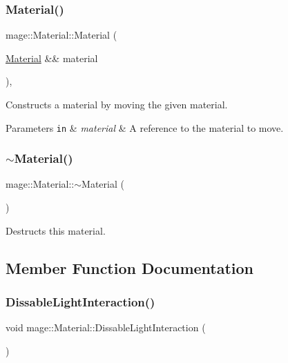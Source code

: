 \subsubsection{\texorpdfstring{Material()}{Material()}\hspace{0.1cm}{\footnotesize\ttfamily [3/3]}}
{\footnotesize\ttfamily mage\+::\+Material\+::\+Material (\begin{DoxyParamCaption}\item[{\hyperlink{classmage_1_1_material}{Material} \&\&}]{material }\end{DoxyParamCaption})\hspace{0.3cm}{\ttfamily [default]}, {\ttfamily [noexcept]}}

Constructs a material by moving the given material.


\begin{DoxyParams}[1]{Parameters}
\mbox{\tt in}  & {\em material} & A reference to the material to move. \\
\hline
\end{DoxyParams}
\hypertarget{classmage_1_1_material_a4ca65b7e24144ee08dd1ce8d0eda9284}{}\label{classmage_1_1_material_a4ca65b7e24144ee08dd1ce8d0eda9284} 
\subsubsection{\texorpdfstring{$\sim$\+Material()}{~Material()}}
{\footnotesize\ttfamily mage\+::\+Material\+::$\sim$\+Material (\begin{DoxyParamCaption}{ }\end{DoxyParamCaption})\hspace{0.3cm}{\ttfamily [default]}}

Destructs this material. 

\subsection{Member Function Documentation}
\hypertarget{classmage_1_1_material_ab4b92a53ee74e401c518eea299fb4e0b}{}\label{classmage_1_1_material_ab4b92a53ee74e401c518eea299fb4e0b} 
\subsubsection{\texorpdfstring{Dissable\+Light\+Interaction()}{DissableLightInteraction()}}
{\footnotesize\ttfamily void mage\+::\+Material\+::\+Dissable\+Light\+Interaction (\begin{DoxyParamCaption}{ }\end{DoxyParamCaption})\hspace{0.3cm}{\ttfamily [noexcept]}}

